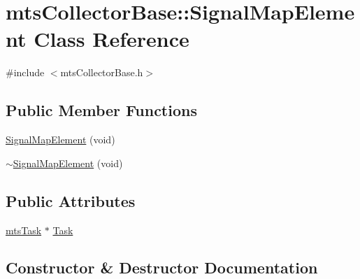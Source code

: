 \hypertarget{classmts_collector_base_1_1_signal_map_element}{}\section{mts\+Collector\+Base\+:\+:Signal\+Map\+Element Class Reference}
\label{classmts_collector_base_1_1_signal_map_element}


{\ttfamily \#include $<$mts\+Collector\+Base.\+h$>$}

\subsection*{Public Member Functions}
\begin{DoxyCompactItemize}
\item 
\hyperlink{classmts_collector_base_1_1_signal_map_element_a498356d3c9dd40e508c9b8caeccaf796}{Signal\+Map\+Element} (void)
\item 
\hyperlink{classmts_collector_base_1_1_signal_map_element_ad473fba6072141f2adedbf4aa4a5f098}{$\sim$\+Signal\+Map\+Element} (void)
\end{DoxyCompactItemize}
\subsection*{Public Attributes}
\begin{DoxyCompactItemize}
\item 
\hyperlink{classmts_task}{mts\+Task} $\ast$ \hyperlink{classmts_collector_base_1_1_signal_map_element_ad0f11dad0c8c30479e8b811795719ae4}{Task}
\end{DoxyCompactItemize}


\subsection{Constructor \& Destructor Documentation}
\hypertarget{classmts_collector_base_1_1_signal_map_element_a498356d3c9dd40e508c9b8caeccaf796}{}
